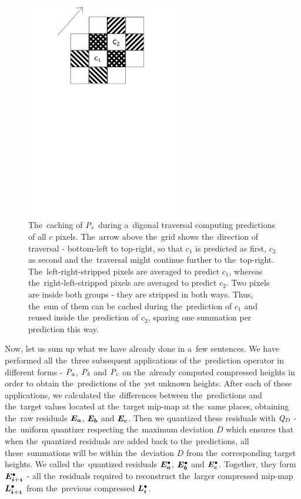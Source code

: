 \begin{figure}
	\includegraphics[trim={0 18cm 1cm 0cm}, clip, width=0.6\textwidth]{figures/ccaching.pdf}\centering
	\caption{The~caching of $\mathit{P_{c}}$ during a~digonal traversal computing predictions of all $c$ pixels. The~arrow above the~grid shows the~direction of traversal - bottom-left to top-right, so that $c_1$ is predicted as first, $c_2$ as second and the~traversal might continue further to the~top-right. The~left-right-stripped pixels are averaged to predict $c_1$, whereas the~right-left-stripped pixels are averaged to predict $c_2$. Two pixels are inside both groups - they are stripped in both ways. Thus, the~sum of them can be cached during the~prediction of $c_1$ and reused inside the~prediction of $c_2$, sparing one summation per prediction this way.}
	\label{fig:ccaching}
\end{figure}


Now, let us sum up what we have already done in a~few sentences. We have performed all the~three subsequent applications of the~prediction operator in different forms - $\mathit{P_{a}}$, $\mathit{P_{b}}$ and $\mathit{P_{c}}$ on the~already computed compressed heights in order to obtain the~predictions of the~yet unknown heights. After each of these applications, we calculated the~differences between the~predictions and the~target values located at the~target mip-map at the~same places, obtaining the~raw residuals $\objnorm{E}{a}$, $\objnorm{E}{b}$ and $\objnorm{E}{c}$. Then we quantized these residuals with $\mathit{Q_{D}}$ - the~uniform quantizer respecting the~maximum deviation $D$ which ensures that when the~quantized residuals are added back to the~predictions, all these~summations will be within the~deviation $D$ from the~corresponding target heights. We called the~quantized residuals $\objdot{E}{a}$, $\objdot{E}{b}$ and $\objdot{E}{c}$. Together, they form $\objdot{E}{i+1}$ - all the~residuals required to reconstruct the~larger compressed mip-map $\ldot{i+1}$ from the~previous compressed $\ldot{i}$.

